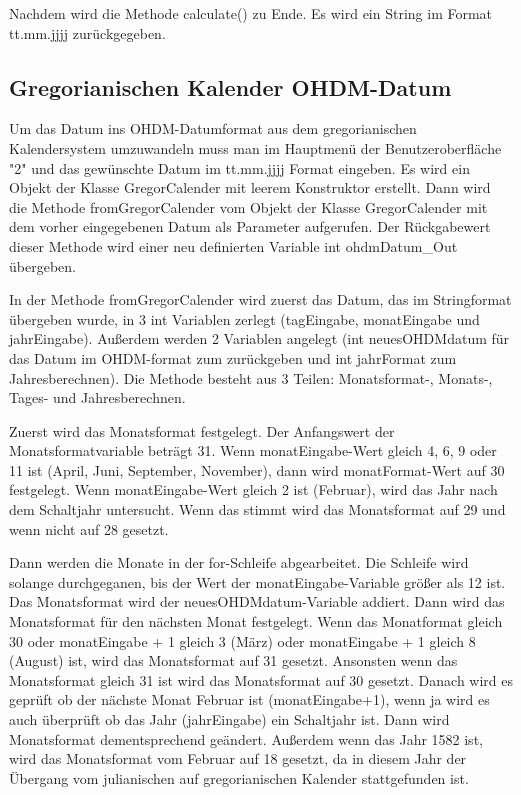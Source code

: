 \documentclass[]{article}
\begin{document}
Nachdem wird die Methode calculate() zu Ende. Es wird ein String im Format tt.mm.jjjj zurückgegeben.

\subsection{Gregorianischen Kalender \textrightarrow OHDM-Datum}
Um das Datum ins OHDM-Datumformat aus dem gregorianischen Kalendersystem umzuwandeln muss man im Hauptmenü der Benutzeroberfläche "2" und das gewünschte Datum im tt.mm.jjjj Format eingeben. Es wird ein Objekt der Klasse GregorCalender mit leerem Konstruktor erstellt. Dann wird die Methode fromGregorCalender vom Objekt der Klasse GregorCalender mit dem vorher eingegebenen Datum als Parameter aufgerufen. Der Rückgabewert dieser Methode wird einer neu definierten Variable int ohdmDatum\_Out übergeben.

In der Methode fromGregorCalender wird zuerst das Datum, das im Stringformat übergeben wurde, in 3 int Variablen zerlegt (tagEingabe, monatEingabe und jahrEingabe). Außerdem werden 2 Variablen angelegt (int neuesOHDMdatum für das Datum im OHDM-format zum zurückgeben und int jahrFormat zum Jahresberechnen). Die Methode besteht aus 3 Teilen: Monatsformat-, Monats-, Tages- und Jahresberechnen.

Zuerst wird das Monatsformat festgelegt. Der Anfangswert der Monatsformatvariable beträgt 31. Wenn monatEingabe-Wert gleich 4, 6, 9 oder 11 ist (April, Juni, September, November), dann wird monatFormat-Wert auf 30 festgelegt. Wenn monatEingabe-Wert gleich 2 ist (Februar), wird das Jahr nach dem Schaltjahr untersucht. Wenn das stimmt wird das Monatsformat auf 29 und wenn nicht auf 28 gesetzt.

Dann werden die Monate in der for-Schleife abgearbeitet. Die Schleife wird solange durchgeganen, bis der Wert der monatEingabe-Variable größer als 12 ist. Das Monatsformat wird der  neuesOHDMdatum-Variable addiert. Dann wird das Monatsformat für den nächsten Monat festgelegt. Wenn das Monatformat gleich 30 oder monatEingabe + 1 gleich 3 (März) oder monatEingabe + 1 gleich 8 (August) ist, wird das Monatsformat auf 31 gesetzt. Ansonsten wenn das Monatsformat gleich 31 ist wird das Monatsformat auf 30 gesetzt. Danach wird es geprüft ob der nächste Monat Februar ist (monatEingabe+1), wenn ja wird es auch überprüft ob das Jahr (jahrEingabe) ein Schaltjahr ist. Dann wird Monatsformat dementsprechend geändert. Außerdem wenn das Jahr 1582 ist, wird das Monatsformat vom Februar auf 18 gesetzt, da in diesem Jahr der Übergang vom julianischen auf gregorianischen Kalender stattgefunden ist.
\end{document}
